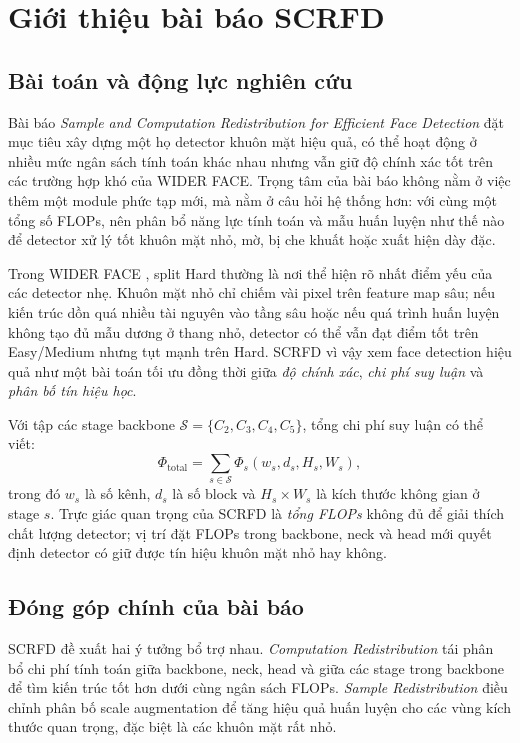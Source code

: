 ﻿%

\chapter{Giới thiệu bài báo SCRFD}

\section{Bài toán và động lực nghiên cứu}

Bài báo \textit{Sample and Computation Redistribution for Efficient Face Detection} đặt mục tiêu xây dựng một họ detector khuôn mặt hiệu quả, có thể hoạt động ở nhiều mức ngân sách tính toán khác nhau nhưng vẫn giữ độ chính xác tốt trên các trường hợp khó của WIDER FACE. Trọng tâm của bài báo không nằm ở việc thêm một module phức tạp mới, mà nằm ở câu hỏi hệ thống hơn: với cùng một tổng số FLOPs, nên phân bổ năng lực tính toán và mẫu huấn luyện như thế nào để detector xử lý tốt khuôn mặt nhỏ, mờ, bị che khuất hoặc xuất hiện dày đặc. \cite{guo2022scrfd}

Trong WIDER FACE \cite{yang2016widerface}, split Hard thường là nơi thể hiện rõ nhất điểm yếu của các detector nhẹ. Khuôn mặt nhỏ chỉ chiếm vài pixel trên feature map sâu; nếu kiến trúc dồn quá nhiều tài nguyên vào tầng sâu hoặc nếu quá trình huấn luyện không tạo đủ mẫu dương ở thang nhỏ, detector có thể vẫn đạt điểm tốt trên Easy/Medium nhưng tụt mạnh trên Hard. SCRFD vì vậy xem face detection hiệu quả như một bài toán tối ưu đồng thời giữa \textit{độ chính xác}, \textit{chi phí suy luận} và \textit{phân bố tín hiệu học}.

Với tập các stage backbone \(\mathcal{S}=\{C_2,C_3,C_4,C_5\}\), tổng chi phí suy luận có thể viết:
\[
\Phi_{\text{total}}=\sum_{s\in\mathcal{S}}\Phi_s(w_s,d_s,H_s,W_s),
\]
trong đó \(w_s\) là số kênh, \(d_s\) là số block và \(H_s\times W_s\) là kích thước không gian ở stage \(s\). Trực giác quan trọng của SCRFD là \textit{tổng FLOPs} không đủ để giải thích chất lượng detector; vị trí đặt FLOPs trong backbone, neck và head mới quyết định detector có giữ được tín hiệu khuôn mặt nhỏ hay không.

\section{Đóng góp chính của bài báo}

SCRFD đề xuất hai ý tưởng bổ trợ nhau. \textit{Computation Redistribution} tái phân bổ chi phí tính toán giữa backbone, neck, head và giữa các stage trong backbone để tìm kiến trúc tốt hơn dưới cùng ngân sách FLOPs. \textit{Sample Redistribution} điều chỉnh phân bố scale augmentation để tăng hiệu quả huấn luyện cho các vùng kích thước quan trọng, đặc biệt là các khuôn mặt rất nhỏ.


